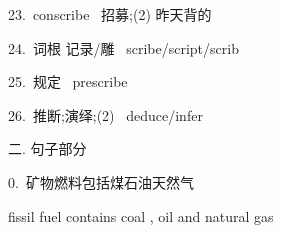 \documentclass[a4paper, 12pt]{article}
\begin{document}
\begin{multicols}{2}
\begin{flushleft}
23.\ conscribe \ 招募;(2) 昨天背的 
\end{flushleft}

\begin{flushleft}
24.\ 词根 记录/雕 \ scribe/script/scrib
\end{flushleft}
\end{multicols}

\begin{multicols}{2}
\begin{flushleft}
25.\ 规定 \ prescribe
\end{flushleft}

\begin{flushleft}
26.\ 推断;演绎;(2) \ deduce/infer
\end{flushleft}
\end{multicols}

\begin{flushleft}
二. 句子部分
\end{flushleft}

\begin{flushleft}
0.\ 矿物燃料包括煤石油天然气

fissil fuel contains coal , oil and natural gas
\end{flushleft}
\end{document}
